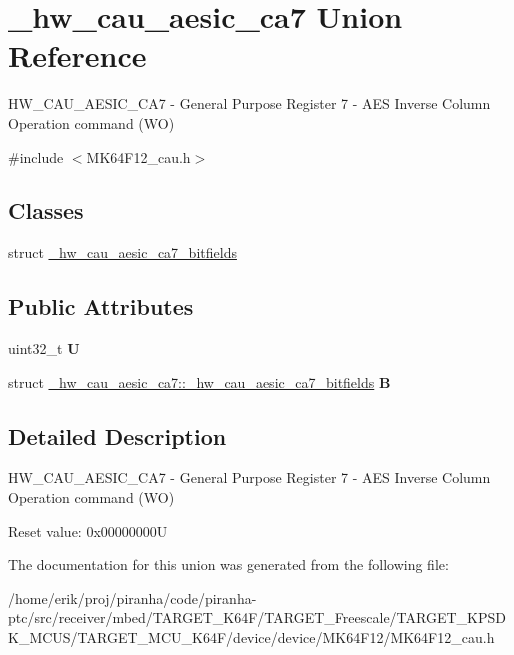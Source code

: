 \hypertarget{union__hw__cau__aesic__ca7}{}\section{\+\_\+hw\+\_\+cau\+\_\+aesic\+\_\+ca7 Union Reference}
\label{union__hw__cau__aesic__ca7}


H\+W\+\_\+\+C\+A\+U\+\_\+\+A\+E\+S\+I\+C\+\_\+\+C\+A7 -\/ General Purpose Register 7 -\/ A\+ES Inverse Column Operation command (WO)  




{\ttfamily \#include $<$M\+K64\+F12\+\_\+cau.\+h$>$}

\subsection*{Classes}
\begin{DoxyCompactItemize}
\item 
struct \hyperlink{struct__hw__cau__aesic__ca7_1_1__hw__cau__aesic__ca7__bitfields}{\+\_\+hw\+\_\+cau\+\_\+aesic\+\_\+ca7\+\_\+bitfields}
\end{DoxyCompactItemize}
\subsection*{Public Attributes}
\begin{DoxyCompactItemize}
\item 
uint32\+\_\+t {\bfseries U}\hypertarget{union__hw__cau__aesic__ca7_abcb64892d40d0c88ba355b98bdfd0ba4}{}\label{union__hw__cau__aesic__ca7_abcb64892d40d0c88ba355b98bdfd0ba4}

\item 
struct \hyperlink{struct__hw__cau__aesic__ca7_1_1__hw__cau__aesic__ca7__bitfields}{\+\_\+hw\+\_\+cau\+\_\+aesic\+\_\+ca7\+::\+\_\+hw\+\_\+cau\+\_\+aesic\+\_\+ca7\+\_\+bitfields} {\bfseries B}\hypertarget{union__hw__cau__aesic__ca7_a11ef3664b6a869297407c8be884689a3}{}\label{union__hw__cau__aesic__ca7_a11ef3664b6a869297407c8be884689a3}

\end{DoxyCompactItemize}


\subsection{Detailed Description}
H\+W\+\_\+\+C\+A\+U\+\_\+\+A\+E\+S\+I\+C\+\_\+\+C\+A7 -\/ General Purpose Register 7 -\/ A\+ES Inverse Column Operation command (WO) 

Reset value\+: 0x00000000U 

The documentation for this union was generated from the following file\+:\begin{DoxyCompactItemize}
\item 
/home/erik/proj/piranha/code/piranha-\/ptc/src/receiver/mbed/\+T\+A\+R\+G\+E\+T\+\_\+\+K64\+F/\+T\+A\+R\+G\+E\+T\+\_\+\+Freescale/\+T\+A\+R\+G\+E\+T\+\_\+\+K\+P\+S\+D\+K\+\_\+\+M\+C\+U\+S/\+T\+A\+R\+G\+E\+T\+\_\+\+M\+C\+U\+\_\+\+K64\+F/device/device/\+M\+K64\+F12/M\+K64\+F12\+\_\+cau.\+h\end{DoxyCompactItemize}
